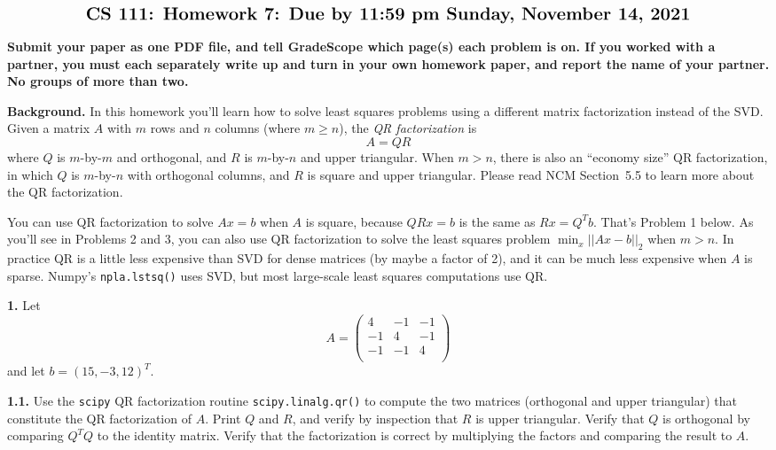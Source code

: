 \documentclass[11pt]{article}
\begin{document}
$$\mbox{\Large \bf CS 111: Homework 7: Due by 11:59 pm Sunday, November 14, 2021}$$
\par\smallskip\noindent
{\bf Submit your paper as one PDF file,
and tell GradeScope which page(s) each problem is on.
If you worked with a partner, 
you must each separately write up and turn in your own homework paper, 
and report the name of your partner.
No groups of more than two.
}

\par\bigskip
{\bf Background.}
In this homework you'll learn how to solve least squares problems using 
a different matrix factorization instead of the SVD.
Given a matrix $A$ with $m$ rows and $n$ columns (where $m \ge n$),
the {\em QR factorization} is
$$A = QR$$
where $Q$ is $m$-by-$m$ and orthogonal, and $R$ is $m$-by-$n$ and upper triangular.
When $m>n$, there is also an ``economy size'' QR factorization,
in which $Q$ is $m$-by-$n$ with orthogonal columns, 
and $R$ is square and upper triangular.
Please read NCM Section~5.5 to learn more about the QR factorization.

You can use QR factorization to solve $Ax=b$ when $A$ is square,
because $QRx=b$ is the same as $Rx=Q^Tb$. That's Problem 1 below.
As you'll see in Problems 2 and 3, you can also use QR factorization
to solve the least squares problem $\min_x||Ax-b||_2$ when $m>n$.
In practice QR is a little less expensive than SVD for dense matrices
(by maybe a factor of 2), and it can be much less expensive when $A$ is sparse.
Numpy's {\tt npla.lstsq()} uses SVD, 
but most large-scale least squares computations use QR.

\par\bigskip
{\bf 1.}
Let
$$A =
   \left(
   \begin{array}{ccc}
    4 & -1 & -1 \\ 	
   -1 &  4 & -1 \\ 
   -1 & -1 &  4 \\
   \end{array} \right)
$$
and let $b = (15, -3, 12)^T$.

\par\medskip
{\bf 1.1.}
Use the {\tt scipy} QR factorization routine {\tt scipy.linalg.qr()}
to compute the two matrices (orthogonal and upper triangular) that
constitute the QR factorization of $A$.
Print $Q$ and $R$, and verify by inspection that $R$ is upper triangular.
Verify that $Q$ is orthogonal by comparing $Q^TQ$ to the identity matrix.
Verify that the factorization is correct by multiplying the factors and 
comparing the result to $A$.
\end{document}
